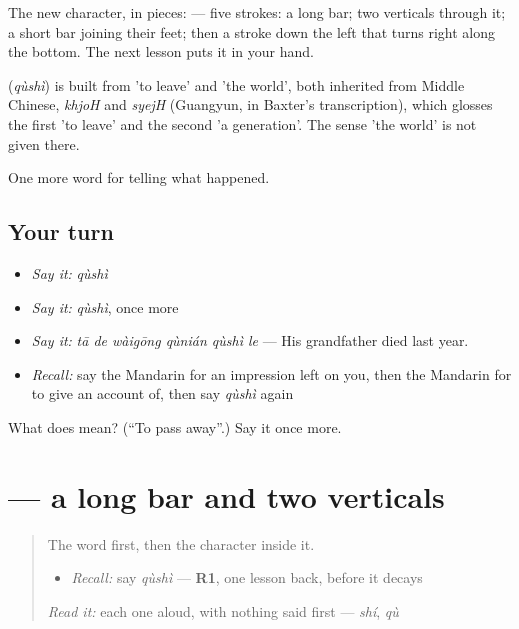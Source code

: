The new character, in pieces:  — five strokes: a long bar; two verticals through it; a short bar joining their feet; then a stroke down the left that turns right along the bottom. The next lesson puts it in your hand.

\begin{cousinweb}
\textbf{} (\emph{qùshì}) is built from  'to leave' and  'the world', both inherited from Middle Chinese, \emph{khjoH} and \emph{syejH} (Guangyun, in Baxter's transcription), which glosses the first 'to leave' and the second 'a generation'. The sense 'the world' is not given there.
\end{cousinweb}

\begin{grammarlens}[title={What you've built}]
One more word for telling what happened.
\end{grammarlens}

\subsection*{Your turn}
\begin{itemize}
\raggedright
  \item \emph{Say it:} \emph{qùshì}
  \item \emph{Say it:} \emph{qùshì}, once more
  \item \emph{Say it:} \emph{tā de wàigōng qùnián qùshì le} — His grandfather died last year.
  \item \emph{Recall:} say the Mandarin for an impression left on you, then the Mandarin for to give an account of, then say \emph{qùshì} again
\end{itemize}

\begin{tcolorbox}[breakable,colback=teal!4,colframe=teal!35!black,title={Before you move on}]
What does  mean? (\textquotedblleft{}To pass away\textquotedblright{}.) Say it once more.
\end{tcolorbox}
\section[\texorpdfstring{\zh{世} (shì)}{世 (shì)}]{ — a long bar and two verticals}

\label{lesson:ZH-W325-shi-world}



\begin{quote}
The word first, then the character inside it.

\begin{itemize}
\raggedright
  \item \emph{Recall:} say \emph{qùshì} — \textbf{R1}, one lesson back, before it decays
\end{itemize}

\begin{quote}
 
\end{quote}

\emph{Read it:} each one aloud, with nothing said first — \emph{shí}, \emph{qù}
\end{quote}

